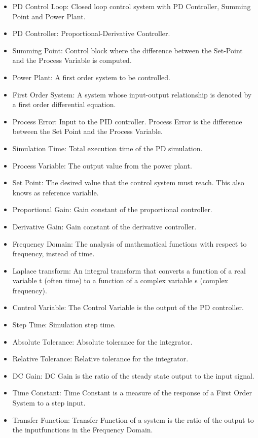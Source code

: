 \documentclass[12pt]{article}
\begin{document}
\begin{itemize}
\item{PD Control Loop: Closed loop control system with PD Controller, Summing Point and Power Plant.}
\item{PD Controller: Proportional-Derivative Controller.}
\item{Summing Point: Control block where the difference between the Set-Point and the Process Variable is computed.}
\item{Power Plant: A first order system to be controlled.}
\item{First Order System: A system whose input-output relationship is denoted by a first order differential equation.}
\item{Process Error: Input to the PID controller. Process Error is the difference between the Set Point and the Process Variable.}
\item{Simulation Time: Total execution time of the PD simulation.}
\item{Process Variable: The output value from the power plant.}
\item{Set Point: The desired value that the control system must reach. This also knows as reference variable.}
\item{Proportional Gain: Gain constant of the proportional controller.}
\item{Derivative Gain: Gain constant of the derivative controller.}
\item{Frequency Domain: The analysis of mathematical functions with respect to frequency, instead of time.}
\item{Laplace transform: An integral transform that converts a function of a real variable t (often time) to a function of a complex variable s (complex frequency).}
\item{Control Variable: The Control Variable is the output of the PD controller.}
\item{Step Time: Simulation step time.}
\item{Absolute Tolerance: Absolute tolerance for the integrator.}
\item{Relative Tolerance: Relative tolerance for the integrator.}
\item{DC Gain: DC Gain is the ratio of the steady state output to the input signal.}
\item{Time Constant: Time Constant is a measure of the response of a First Order System to a step input.}
\item{Transfer Function: Transfer Function of a system is the ratio of the output to the inputfunctions in the Frequency Domain.}
\end{itemize}
\end{document}

